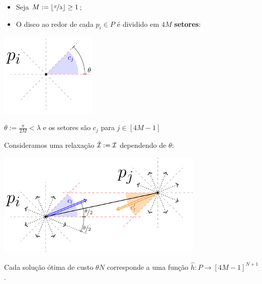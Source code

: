 \begin{frame}{}
    \begin{itemize}[<+->]
        \item Seja $M := \lfloor\nicefrac{\pi}{\lambda}\rfloor \geq 1$;

        \item O disco ao redor de cada $p_i\in P$ é dividido em $4M$ \textbf{setores}:
    \end{itemize}
    
    \bigskip
    \pause
    \begin{minipage}{\linewidth}
        \centering
        \includegraphics[height=4cm]{MSC/angle.png}
    \end{minipage}

    \bigskip
    \centering
    $\theta := \frac{\pi}{2M} < \lambda$ e os setores são $c_j$ para $j \in [4M-1]$
\end{frame}

\begin{frame}{}
    Consideramos uma relaxação ${\hat {\mathcal{I}}:= \mathcal{I}}$ dependendo de $\theta$:
    
    \bigskip
    \pause
    \begin{minipage}{\linewidth}
        \centering
        \includegraphics[height=5cm]{MSC/discrete.png}
    \end{minipage}
\end{frame}

\begin{frame}{}
    \begin{obs}
        Cada solução ótima de custo $\theta N$ corresponde a uma função \mbox{$\hat h\colon P \to [4M-1]^{N+1}$}.
    \end{obs}
\end{frame}

